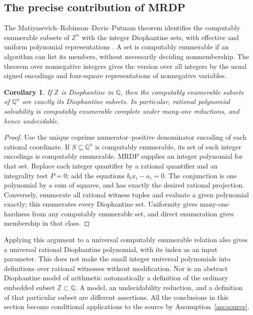 \documentclass[11pt]{article}
\newtheorem{corollary}[theorem]{Corollary}
\theoremstyle{definition}
\newcommand{\Q}{\mathbb Q}
\newcommand{\Z}{\mathbb Z}
\begin{document}
\subsection{The precise contribution of MRDP}

The Matiyasevich--Robinson--Davis--Putnam theorem identifies the
computably enumerable subsets of $\Z^n$ with the integer Diophantine
sets, with effective and uniform polynomial representations
\cite{Matiyasevich1970,Jones1982}. A set is computably enumerable if
an algorithm can list its members, without necessarily deciding
nonmembership. The theorem over nonnegative integers gives the version
over all integers by the usual signed encodings and four-square
representations of nonnegative variables.

\begin{corollary}\label{cor:rational-mrdp}
If $\Z$ is Diophantine in $\Q$, then the computably enumerable
subsets of $\Q^n$ are exactly its Diophantine subsets. In particular,
rational polynomial solvability is computably enumerable complete
under many-one reductions, and hence undecidable.
\end{corollary}
\begin{proof}
Use the unique coprime numerator--positive denominator encoding of
each rational coordinate. If $S\subseteq\Q^n$ is computably
enumerable, its set of such integer encodings is computably enumerable.
MRDP supplies an integer polynomial for that set. Replace each integer
quantifier by a rational quantifier and an integrality test $P=0$;
add the equations $b_i x_i-a_i=0$. The conjunction is one polynomial
by a sum of squares, and has exactly the desired rational projection.
Conversely, enumerate all rational witness tuples and evaluate a given
polynomial exactly; this enumerates every Diophantine set.
Uniformity gives many-one hardness from any computably enumerable
set, and direct enumeration gives membership in that class.
\end{proof}

Applying this argument to a universal computably enumerable relation
also gives a universal rational Diophantine polynomial, with its index
as an input parameter. This does not make the small integer universal
polynomials into definitions over rational witnesses without modification.
Nor is an abstract Diophantine model of arithmetic automatically a
definition of the ordinary embedded subset $\Z\subset\Q$. A model,
an undecidability reduction, and a definition of that particular subset
are different assertions. All the conclusions in this section become
conditional applications to the source by
Assumption~\ref{ass:source}.
\end{document}
